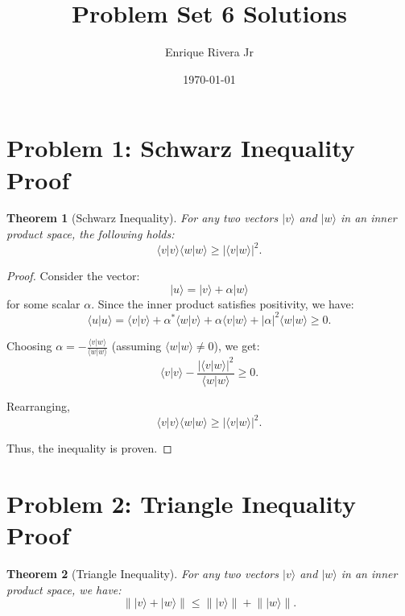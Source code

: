 \documentclass[12pt]{article}
\newtheorem{theorem}{Theorem}
\newcommand{\braket}[2]{\langle #1 | #2 \rangle}
\newcommand{\norm}[1]{\lVert #1 \rVert}
\begin{document}
\title{Problem Set 6 Solutions}
\author{Enrique Rivera Jr}
\date{\today}

\maketitle

\section*{Problem 1: Schwarz Inequality Proof}

\begin{theorem}[Schwarz Inequality]
For any two vectors \( |v\rangle \) and \( |w\rangle \) in an inner product space, the following holds:
\[
\braket{v}{v} \braket{w}{w} \geq |\braket{v}{w}|^2.
\]
\end{theorem}

\begin{proof}
Consider the vector:
\[
|u\rangle = |v\rangle + \alpha |w\rangle
\]
for some scalar \( \alpha \). Since the inner product satisfies positivity, we have:
\[
\braket{u}{u} = \braket{v}{v} + \alpha^* \braket{w}{v} + \alpha \braket{v}{w} + |\alpha|^2 \braket{w}{w} \geq 0.
\]

Choosing \( \alpha = -\frac{\braket{v}{w}}{\braket{w}{w}} \) (assuming \( \braket{w}{w} \neq 0 \)), we get:
\[
\braket{v}{v} - \frac{|\braket{v}{w}|^2}{\braket{w}{w}} \geq 0.
\]

Rearranging,
\[
\braket{v}{v} \braket{w}{w} \geq |\braket{v}{w}|^2.
\]

Thus, the inequality is proven.
\end{proof}





\section*{Problem 2: Triangle Inequality Proof}

\begin{theorem}[Triangle Inequality]
For any two vectors \( |v\rangle \) and \( |w\rangle \) in an inner product space, we have:
\[
\norm{|v\rangle + |w\rangle} \leq \norm{|v\rangle} + \norm{|w\rangle}.
\]
\end{theorem}
\end{document}
